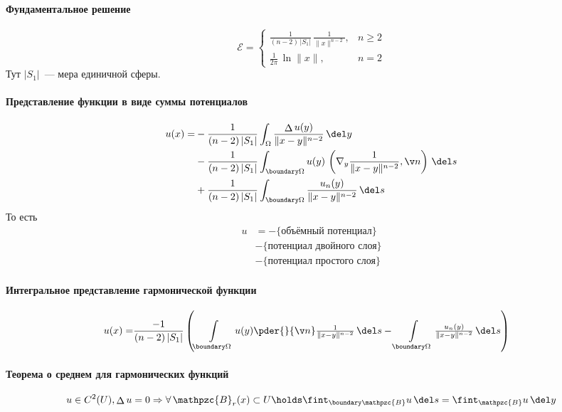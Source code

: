 \documentclass[exam]{trchesh}
\newcommand{\laplop}{\mathop{\Delta}}
\def\Ball{\mathpzc{B}}
\begin{document}
\paragraph{Фундаментальное решение}
\[
  \mathcal E = \begin{cases}
    \frac{1}{(n-2)\, |S_1|}\, \frac{1}{\|x\|^{n-2}}, & n \geqslant 2 \\[1em]
    \tfrac{1}{2\pi}\, \ln\|x\|, & n = 2
  \end{cases}
\]
Тут $|S_1|$~--- мера единичной сферы.

\paragraph{Представление функции в виде суммы потенциалов}
\[
  \begin{split} 
    u(x) = &- \frac{1}{(n-2)\,|S_1|} \int_\Omega \frac{\laplop u(y)}{\|x-y\|^{n-2}} \, \del y \\
           &- \frac{1}{(n-2)\,|S_1|} \int_{\boundary \Omega} u(y)\, 
              \left(\nabla_y\frac{1}{\|x-y\|^{n-2}}, \v n\right) \, \del s          \\
           &+ \frac{1}{(n-2)\,|S_1|} \int_{\boundary \Omega} \frac{u_n(y)}{\|x-y\|^{n-2}}\,\del s
  \end{split}
\]
То есть
\[
  \begin{split}
    u &= -\{\text{объёмный потенциал}\} \\ &- \{\text{потенциал двойного слоя}\} \\
      &- \{\text{потенциал простого слоя}\}
  \end{split}
\]

\paragraph{Интегральное представление гармонической функции}
\[
  \begin{split} 
    u(x) = &\frac{-1}{(n-2)\,|S_1|} \left(
      \int\limits_{\boundary \Omega} u(y) {\textstyle\pder{}{\v n}\frac{1}{\|x-y\|^{n-2}}}\,\del s - 
      \int\limits_{\boundary \Omega} \tfrac{u_n(y)}{\|x-y\|^{n-2}}\,\del s
    \right)
  \end{split}
\]

\paragraph{Теорема о среднем для гармонических функций}
\[
  u\in C^2(U),\laplop u = 0 \Rightarrow \forall\, \Ball_{r}(x) \subset U \holds  \fint_{\boundary \Ball} u\, \del s
  = \fint_{\Ball} u \, \del y
\]
\end{document}
